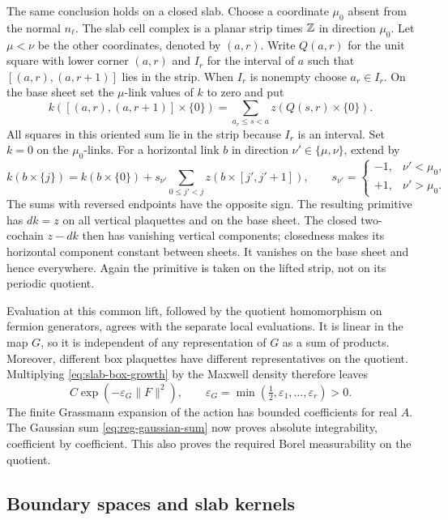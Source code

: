 The same conclusion holds on a closed slab. Choose a coordinate
$\mu_0$ absent from the normal $n_\ell$. The slab cell complex is a
planar strip times $\mathbb Z$ in direction $\mu_0$.
Let $\mu<\nu$ be the other coordinates, denoted by $(a,r)$.
Write $Q(a,r)$ for the unit square with lower corner $(a,r)$ and
$I_r$ for the interval of $a$ such that $[(a,r),(a,r+1)]$ lies
in the strip. When $I_r$ is nonempty choose $a_r\in I_r$.
On the base sheet set the $\mu$-link values of $k$ to zero and put
\[
 k([(a,r),(a,r+1)]\times\{0\})
       =\sum_{a_r\le s<a}z(Q(s,r)\times\{0\}).
\]
All squares in this oriented sum lie in the strip because $I_r$
is an interval. Set $k=0$ on the $\mu_0$-links. For a horizontal
link $b$ in direction $\nu'\in\{\mu,\nu\}$, extend by
\[
 k(b\times\{j\})=k(b\times\{0\})
       +s_{\nu'}\sum_{0\le j'<j}z(b\times[j',j'+1]),
 \qquad
 s_{\nu'}=\begin{cases}-1,&\nu'<\mu_0,\\+1,&\nu'>\mu_0.\end{cases}
\]
The sums with reversed endpoints have the opposite sign.
The resulting primitive has $dk=z$ on all vertical
plaquettes and on the base sheet. The closed two-cochain $z-dk$ then
has vanishing vertical components; closedness makes its horizontal
component constant between sheets. It vanishes on the base sheet and
hence everywhere. Again the primitive is taken on the lifted strip,
not on its periodic quotient.

Evaluation at this common lift, followed by the quotient homomorphism
on fermion generators, agrees with the separate local evaluations.
It is linear in the map $G$, so it is independent of any representation
of $G$ as a sum of products. Moreover, different box plaquettes have
different representatives on the quotient. Multiplying
\eqref{eq:slab-box-growth} by the Maxwell density therefore leaves
\begin{equation}\label{eq:slab-local-majorant}
 C\exp(-\varepsilon_G\|F\|^2),\qquad
 \varepsilon_G=\min(\tfrac12,\varepsilon_1,\ldots,\varepsilon_r)>0.
\end{equation}
The finite Grassmann expansion of the action has bounded coefficients
for real $A$. The Gaussian sum \eqref{eq:reg-gaussian-sum} now proves
absolute integrability, coefficient by coefficient. This also proves
the required Borel measurability on the quotient.

\subsection{Boundary spaces and slab kernels}\label{subsec:slab-kernels}

